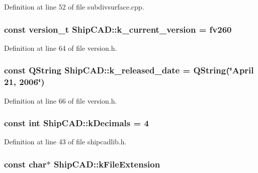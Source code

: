 Definition at line 52 of file subdivsurface.\-cpp.

\hypertarget{namespaceShipCAD_aa3415e1acf9bdb19e24f31f5138d6a60}{
\subsubsection[{k\-\_\-current\-\_\-version}]{\setlength{\rightskip}{0pt plus 5cm}const {\bf version\-\_\-t} Ship\-C\-A\-D\-::k\-\_\-current\-\_\-version = {\bf fv260}}}\label{namespaceShipCAD_aa3415e1acf9bdb19e24f31f5138d6a60}


Definition at line 64 of file version.\-h.

\hypertarget{namespaceShipCAD_a833fc6d39d2f0fd7fa31d0a691b0b726}{
\subsubsection[{k\-\_\-released\-\_\-date}]{\setlength{\rightskip}{0pt plus 5cm}const Q\-String Ship\-C\-A\-D\-::k\-\_\-released\-\_\-date = Q\-String(\char`\"{}April 21, 2006\char`\"{})}}\label{namespaceShipCAD_a833fc6d39d2f0fd7fa31d0a691b0b726}


Definition at line 66 of file version.\-h.

\hypertarget{namespaceShipCAD_ac88ffd27e117a3e612997a36a5d4616d}{
\subsubsection[{k\-Decimals}]{\setlength{\rightskip}{0pt plus 5cm}const int Ship\-C\-A\-D\-::k\-Decimals = 4}}\label{namespaceShipCAD_ac88ffd27e117a3e612997a36a5d4616d}


Definition at line 43 of file shipcadlib.\-h.

\hypertarget{namespaceShipCAD_a76ec58fc6d779982def49fface17b1a4}{
\subsubsection[{k\-File\-Extension}]{\setlength{\rightskip}{0pt plus 5cm}const char$\ast$ Ship\-C\-A\-D\-::k\-File\-Extension}}\label{namespaceShipCAD_a76ec58fc6d779982def49fface17b1a4}


